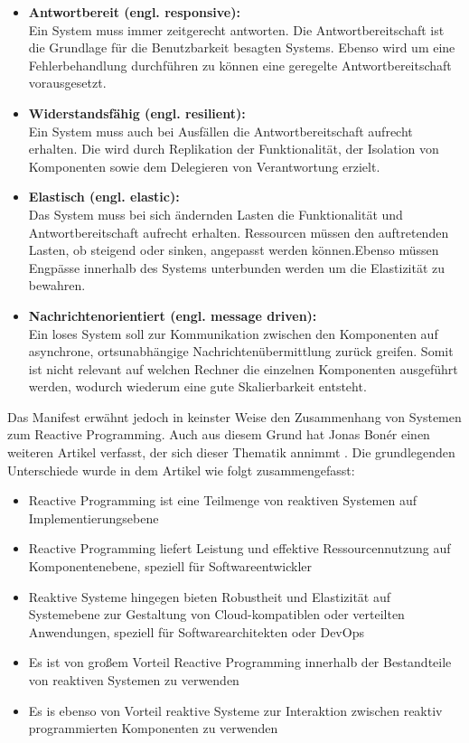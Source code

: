 \begin{itemize}
	\item \textbf{Antwortbereit (engl. responsive):}\\ Ein System muss immer zeitgerecht antworten. Die Antwortbereitschaft ist die Grundlage für die Benutzbarkeit besagten Systems. Ebenso wird um eine Fehlerbehandlung durchführen zu können eine geregelte Antwortbereitschaft vorausgesetzt.
	\item \textbf{Widerstandsfähig (engl. resilient):}\\ Ein System muss auch bei Ausfällen die Antwortbereitschaft aufrecht erhalten. Die wird durch Replikation der Funktionalität, der Isolation von Komponenten sowie dem Delegieren von Verantwortung erzielt. 
	\item \textbf{Elastisch (engl. elastic):}\\ Das System muss bei sich ändernden Lasten die Funktionalität und Antwortbereitschaft aufrecht erhalten. Ressourcen müssen den auftretenden Lasten, ob steigend oder sinken, angepasst werden können.Ebenso müssen Engpässe innerhalb des Systems unterbunden werden um die Elastizität zu bewahren.
	\item \textbf{Nachrichtenorientiert (engl. message driven):}\\ Ein loses System soll zur Kommunikation zwischen den Komponenten auf asynchrone, ortsunabhängige Nachrichtenübermittlung zurück greifen. Somit ist nicht relevant auf welchen Rechner die einzelnen Komponenten ausgeführt werden, wodurch wiederum eine gute Skalierbarkeit entsteht.
\end{itemize}
Das Manifest erwähnt jedoch in keinster Weise den Zusammenhang von Systemen zum Reactive Programming. Auch aus diesem Grund hat Jonas Bonér einen weiteren Artikel verfasst, der sich dieser Thematik annimmt \cite{Boner.}. Die grundlegenden Unterschiede wurde in dem Artikel wie folgt zusammengefasst:
\begin{itemize}
	\item Reactive Programming ist eine Teilmenge von reaktiven Systemen auf Implementierungsebene
	\item Reactive Programming liefert Leistung und effektive Ressourcennutzung auf Komponentenebene, speziell für Softwareentwickler
	\item Reaktive Systeme hingegen bieten Robustheit und Elastizität auf Systemebene zur Gestaltung von Cloud-kompatiblen oder verteilten Anwendungen, speziell für Softwarearchitekten oder DevOps
	\item Es ist von großem Vorteil Reactive Programming innerhalb der Bestandteile von reaktiven Systemen zu verwenden
	\item Es is ebenso von Vorteil reaktive Systeme zur Interaktion zwischen reaktiv programmierten Komponenten zu verwenden
\end{itemize}
